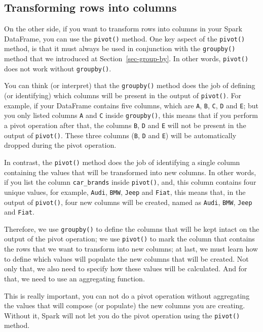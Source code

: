 \documentclass[
  11pt,
  letterpaper,
  DIV=11,
  numbers=noendperiod]{scrreprt}
\begin{document}
\hypertarget{transforming-rows-into-columns}{%
\subsection{Transforming rows into
columns}\label{transforming-rows-into-columns}}

On the other side, if you want to transform rows into columns in your
Spark DataFrame, you can use the \texttt{pivot()} method. One key aspect
of the \texttt{pivot()} method, is that it must always be used in
conjunction with the \texttt{groupby()} method that we introduced at
Section~\ref{sec-group-by}. In other words, \texttt{pivot()} does not
work without \texttt{groupby()}.

You can think (or interpret) that the \texttt{groupby()} method does the
job of defining (or identifying) which columns will be present in the
output of \texttt{pivot()}. For example, if your DataFrame contains five
columns, which are \texttt{A}, \texttt{B}, \texttt{C}, \texttt{D} and
\texttt{E}; but you only listed columns \texttt{A} and \texttt{C} inside
\texttt{groupby()}, this means that if you perform a pivot operation
after that, the columns \texttt{B}, \texttt{D} and \texttt{E} will not
be present in the output of \texttt{pivot()}. These three columns
(\texttt{B}, \texttt{D} and \texttt{E}) will be automatically dropped
during the pivot operation.

In contrast, the \texttt{pivot()} method does the job of identifying a
single column containing the values that will be transformed into new
columns. In other words, if you list the column \texttt{car\_brands}
inside \texttt{pivot()}, and, this column contains four unique values,
for example, \texttt{Audi}, \texttt{BMW}, \texttt{Jeep} and
\texttt{Fiat}, this means that, in the output of \texttt{pivot()}, four
new columns will be created, named as \texttt{Audi}, \texttt{BMW},
\texttt{Jeep} and \texttt{Fiat}.

Therefore, we use \texttt{groupby()} to define the columns that will be
kept intact on the output of the pivot operation; we use
\texttt{pivot()} to mark the column that contains the rows that we want
to transform into new columns; at last, we must learn how to define
which values will populate the new columns that will be created. Not
only that, we also need to specify how these values will be calculated.
And for that, we need to use an aggregating function.

This is really important, you can not do a pivot operation without
aggregating the values that will compose (or populate) the new columns
you are creating. Without it, Spark will not let you do the pivot
operation using the \texttt{pivot()} method.
\end{document}
